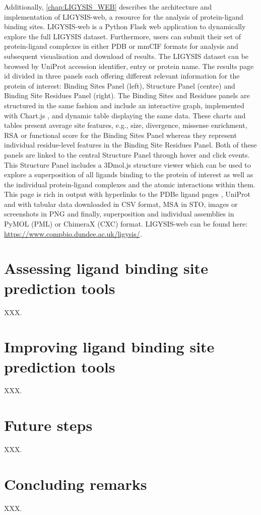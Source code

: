Additionally, \autoref{chap:LIGYSIS_WEB} describes the architecture and implementation of LIGYSIS-web, a resource for the analysis of protein-ligand binding sites. LIGYSIS-web is a Python Flask \cite{GRINBERG_2018_FLASK} web application to dynamically explore the full LIGYSIS dataset. Furthermore, users can submit their set of protein-ligand complexes in either PDB or mmCIF formats for analysis and subsequent visualisation and download of results. The LIGYSIS dataset can be browsed by UniProt accession identifier, entry or protein name. The results page id divided in three panels each offering different relevant information for the protein of interest: Binding Sites Panel (left), Structure Panel (centre) and Binding Site Residues Panel (right). The Binding Sites and Residues panels are structured in the same fashion and include an interactive graph, implemented with Chart.js \cite{CHARTJS}, and dynamic table displaying the same data. These charts and tables present average site features, e.g., size, divergence, missense enrichment, RSA or functional score for the Binding Sites Panel whereas they represent individual residue-level features in the Binding Site Residues Panel. Both of these panels are linked to the central Structure Panel through hover and click events. This Structure Panel includes a 3Dmol.js \cite{REGO_2014_3DMOL} structure viewer which can be used to explore a superposition of all ligands binding to the protein of interest as well as the individual protein-ligand complexes and the atomic interactions within them. This page is rich in output with hyperlinks to the PDBe ligand pages \cite{CHOUDHARY_2024_PDBETOOLS}, UniProt and with tabular data downloaded in CSV format, MSA in STO, images or screenshots in PNG and finally, superposition and individual assemblies in PyMOL (PML) or ChimeraX (CXC) format. LIGYSIS-web can be found here: \url{https://www.compbio.dundee.ac.uk/ligysis/}.

\section{Assessing ligand binding site prediction tools}

XXX.

\section{Improving ligand binding site prediction tools}

XXX.

\section{Future steps}

XXX.

\section{Concluding remarks}

XXX.
